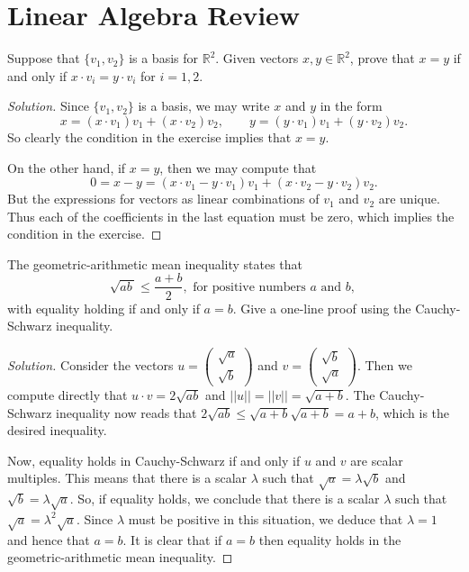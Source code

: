 \documentclass[Shifrin_Solutions_Spring_2015.tex]{subfiles}
\begin{document}
\section{Linear Algebra Review}

\begin{exercise} Suppose that $\{ v_1, v_2 \}$ is a basis for $\mathbb{R}^2$. Given vectors $x, y \in \mathbb{R}^2$, prove that $x=y$ if and only if $x \cdot v_i = y \cdot v_i$ for $i = 1, 2$.
\end{exercise}

\begin{proof}[Solution] Since $\{v_1, v_2 \}$ is a basis, we may write $x$ and $y$ in the form
\[
x = (x\cdot v_1) v_1 + (x\cdot v_2) v_2 , \qquad y = (y\cdot v_1) v_1 + (y\cdot v_2) v_2 .
\]
So clearly the condition in the exercise implies that $x = y$.

On the other hand, if $x=y$, then we may compute that
\[
0 = x-y = (  x\cdot v_1 - y \cdot v_1) v_1 + (x\cdot v_2 - y\cdot v_2) v_2 .
\]
But the expressions for vectors as linear combinations of $v_1$ and $v_2$ are unique. Thus each of the coefficients in the last equation must be zero, which implies the condition in the exercise.
\end{proof}

\vspace{1cm}


\begin{exercise} The geometric-arithmetic mean inequality states that
\[
\sqrt{ab\,} \leq \dfrac{a+b}{2}, \text{ for positive numbers $a$ and $b$, }
\]
with equality holding if and only if $a=b$.
Give a one-line proof using the Cauchy-Schwarz inequality.
\end{exercise}

\begin{proof}[Solution]
Consider the vectors $ u = \begin{pmatrix} \sqrt{a }\\ \sqrt{b} \end{pmatrix}$ and $v = \begin{pmatrix} \sqrt{b } \\ \sqrt{a } \end{pmatrix}$. Then we compute directly that $u \cdot v = 2 \sqrt{ab }$
and $|| u || = ||v|| = \sqrt{ a+ b}$. The Cauchy-Schwarz inequality now reads that $2 \sqrt{ab} \leq \sqrt{a+b} \sqrt{a+b} = a + b$, which is the desired inequality.

Now, equality holds in Cauchy-Schwarz if and only if $u$ and $v$ are scalar multiples. This means that there is a scalar $\lambda$ such that $\sqrt{a} = \lambda\sqrt{b}$ and $\sqrt{b}= \lambda\sqrt{a}$. So, if equality holds, we conclude that there is a scalar $\lambda$ such that $\sqrt{a} = \lambda^2 \sqrt{a}$. Since $\lambda$ must be positive in this situation, we deduce that $\lambda = 1$ and hence that $a = b$. It is clear that if $a=b$ then equality holds in the geometric-arithmetic mean inequality.
\end{proof}
\end{document}
